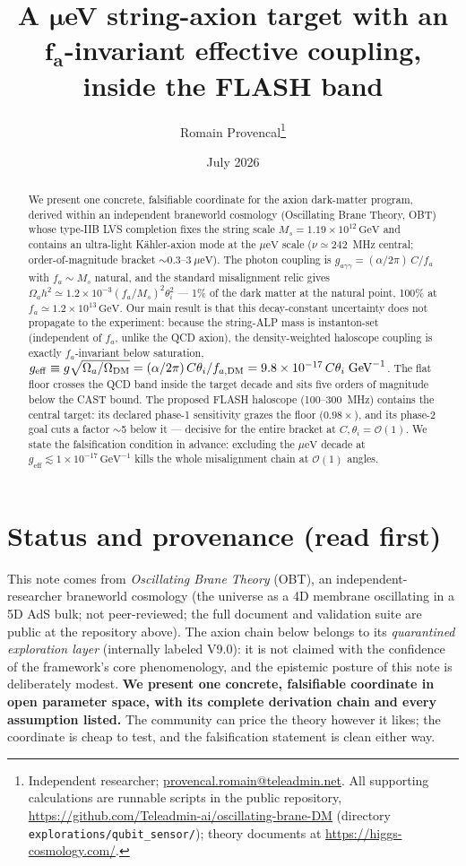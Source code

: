 \documentclass[11pt]{article}
\title{\bfseries A $\boldsymbol{\mu}$eV string-axion target with an $\boldsymbol{f_a}$-invariant
effective coupling, inside the FLASH band}
\author{Romain Provencal\thanks{Independent researcher;
\href{mailto:provencal.romain@teleadmin.net}{provencal.romain@teleadmin.net}. All supporting
calculations are runnable scripts in the public repository,
\url{https://github.com/Teleadmin-ai/oscillating-brane-DM} (directory
\texttt{explorations/qubit\_sensor/}); theory documents at \url{https://higgs-cosmology.com/}.}}
\date{July 2026}
\newcommand{\geff}{g_{\mathrm{eff}}}
\newcommand{\gagg}{g_{a\gamma\gamma}}
\newcommand{\ueV}{\mu\mathrm{eV}}
\newcommand{\GeV}{\mathrm{GeV}}
\begin{document}
\maketitle

\begin{abstract}
\noindent We present one concrete, falsifiable coordinate for the axion dark-matter program, derived
within an independent braneworld cosmology (Oscillating Brane Theory, OBT) whose type-IIB LVS
completion fixes the string scale $M_s = 1.19\times10^{12}\,\GeV$ and contains an ultra-light
K\"ahler-axion mode at the $\ueV$ scale ($\nu \simeq 242$~MHz central; order-of-magnitude bracket
$\sim 0.3\text{--}3~\ueV$). The photon coupling is $\gagg = (\alpha/2\pi)\,C/f_a$ with
$f_a \sim M_s$ natural, and the standard misalignment relic gives
$\Omega_a h^2 \simeq 1.2\times10^{-3} (f_a/M_s)^2\theta_i^2$ --- 1\% of the dark matter at the natural
point, 100\% at $f_a \simeq 1.2\times10^{13}\,\GeV$. Our main result is that this decay-constant
uncertainty does not propagate to the experiment: because the string-ALP mass is instanton-set
(independent of $f_a$, unlike the QCD axion), the density-weighted haloscope coupling is exactly
$f_a$-invariant below saturation,
$\geff \equiv g\sqrt{\Omega_a/\Omega_{\rm DM}} = (\alpha/2\pi)\,C\theta_i/f_{a,\rm DM}
= 9.8\times10^{-17}\,C\theta_i\;\GeV^{-1}$.
The flat floor crosses the QCD band inside the target decade and sits five orders of magnitude below
the CAST bound. The proposed FLASH haloscope (100--300~MHz) contains the central target: its declared
phase-1 sensitivity grazes the floor ($0.98\times$), and its phase-2 goal cuts a factor $\sim$5 below
it --- decisive for the entire bracket at $C,\theta_i = \mathcal{O}(1)$. We state the falsification
condition in advance: excluding the $\ueV$ decade at $\geff \lesssim 1\times10^{-17}\,\GeV^{-1}$ kills
the whole misalignment chain at $\mathcal{O}(1)$ angles.
\end{abstract}

\section{Status and provenance (read first)}
This note comes from \emph{Oscillating Brane Theory} (OBT), an independent-researcher braneworld
cosmology (the universe as a 4D membrane oscillating in a 5D AdS bulk; not peer-reviewed; the full
document and validation suite are public at the repository above). The axion chain below belongs to
its \emph{quarantined exploration layer} (internally labeled V9.0): it is not claimed with the
confidence of the framework's core phenomenology, and the epistemic posture of this note is
deliberately modest. \textbf{We present one concrete, falsifiable coordinate in open parameter space,
with its complete derivation chain and every assumption listed.} The community can price the theory
however it likes; the coordinate is cheap to test, and the falsification statement is clean either
way.
\end{document}
